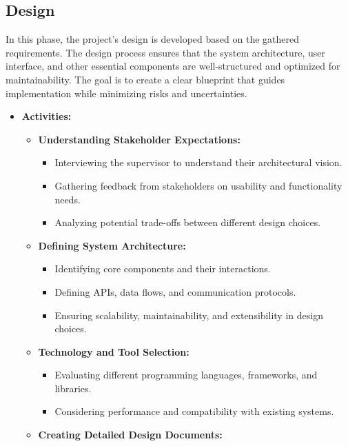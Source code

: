 \documentclass{article}
\begin{document}
\subsection{Design}
In this phase, the project's design is developed based on the gathered requirements.
The design process ensures that the system architecture, user interface, and other essential components are well-structured and optimized for maintainability.
The goal is to create a clear blueprint that guides implementation while minimizing risks and uncertainties.

\begin{itemize}[leftmargin=*, label={}]
    \item \textbf{Activities:}
    \begin{itemize}
        \item \textbf{Understanding Stakeholder Expectations:}
        \begin{itemize}
            \item Interviewing the supervisor to understand their architectural vision.
            \item Gathering feedback from stakeholders on usability and functionality needs.
            \item Analyzing potential trade-offs between different design choices.
        \end{itemize}
        \item \textbf{Defining System Architecture:}
        \begin{itemize}
            \item Identifying core components and their interactions.
            \item Defining APIs, data flows, and communication protocols.
            \item Ensuring scalability, maintainability, and extensibility in design choices.
        \end{itemize}
        \item \textbf{Technology and Tool Selection:}
        \begin{itemize}
            \item Evaluating different programming languages, frameworks, and libraries.
            \item Considering performance and compatibility with existing systems.
        \end{itemize}
        \item \textbf{Creating Detailed Design Documents:}
        \begin{itemize}

\end{itemize}
\end{itemize}
\end{itemize}
\end{document}

